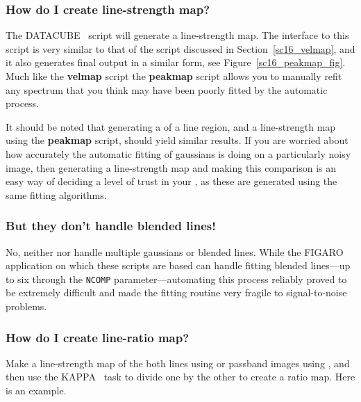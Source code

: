 \documentclass[twoside,11pt]{starlink}
\providecommand{\DATACUBE}{{\footnotesize DATACUBE}\normalsize}
\providecommand{\FIGARO}{{\footnotesize FIGARO}\normalsize}
\providecommand{\KAPPA}{{\footnotesize KAPPA}\normalsize}
\begin{document}
\subsubsection{How do I create line-strength map?}

The \DATACUBE\  script will
generate a line-strength map.  The interface to this script is very
similar to that of the  script
discussed in Section~\ref{sc16_velmap},
and it also generates final output in a similar form, see
Figure~\ref{sc16_peakmap_fig}.  Much like the \textbf{velmap} script the
\textbf{peakmap} script allows you to manually refit any spectrum that
you think may have been poorly fitted by the automatic process.


It should be noted that generating a  of a line region, and a line-strength map
using the \textbf{peakmap} script, should yield similar results.  If you
are worried about how accurately the automatic fitting of gaussians is
doing on a particularly noisy image, then generating a line-strength
map and making this comparison is an easy way of deciding a level of
trust in your , as these are
generated using the same fitting algorithms.

\subsubsection{But they don't handle blended lines!}

No, neither  nor  handle multiple gaussians or blended lines.
While the \FIGARO\  application on
which these scripts are based can handle fitting blended lines---up to
six through the \texttt{NCOMP} parameter---automating this process reliably
proved to be extremely difficult and made the fitting routine very
fragile to signal-to-noise problems.

\subsubsection{How do I create line-ratio map?}

Make a line-strength map of the both lines using  or passband images using , and then use the \KAPPA\
 task to divide one by the other to create a
ratio map.  Here is an example.
\end{document}
